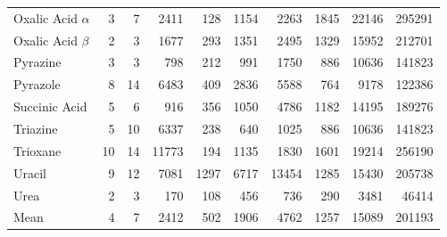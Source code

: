 \begin{table}[h]
\begin{tabular}{lrrrrrrrrr}
Oxalic Acid $\alpha$ & 3 & 7 & 2411 & 128 & 1154 & 2263 & 1845 & 22146 & 295291 \\
Oxalic Acid $\beta$ & 2 & 3 & 1677 & 293 & 1351 & 2495 & 1329 & 15952 & 212701 \\
Pyrazine & 3 & 3 & 798 & 212 & 991 & 1750 & 886 & 10636 & 141823 \\
Pyrazole & 8 & 14 & 6483 & 409 & 2836 & 5588 & 764 & 9178 & 122386 \\
Succinic Acid & 5 & 6 & 916 & 356 & 1050 & 4786 & 1182 & 14195 & 189276 \\
Triazine & 5 & 10 & 6337 & 238 & 640 & 1025 & 886 & 10636 & 141823 \\
Trioxane & 10 & 14 & 11773 & 194 & 1135 & 1830 & 1601 & 19214 & 256190 \\
Uracil & 9 & 12 & 7081 & 1297 & 6717 & 13454 & 1285 & 15430 & 205738 \\
Urea & 2 & 3 & 170 & 108 & 456 & 736 & 290 & 3481 & 46414 \\
Mean & 4 & 7 & 2412 & 502 & 1906 & 4762 & 1257 & 15089 & 201193 \\
\bottomrule
\end{tabular}

\end{table}